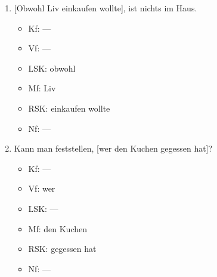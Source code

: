 \begin{enumerate}
\begin{itemize}
    \end{itemize}
  \item{} [Obwohl Liv einkaufen wollte], ist nichts im Haus.
    \begin{itemize}\Lf
      \item Kf: ---
      \item Vf: ---
      \item LSK: obwohl
      \item Mf: Liv
      \item RSK: einkaufen wollte
      \item Nf: ---
    \end{itemize}
  \item Kann man feststellen, [wer den Kuchen gegessen hat]?
    \begin{itemize}\Lf
      \item Kf: ---
      \item Vf: wer
      \item LSK: ---
      \item Mf: den Kuchen
      \item RSK: gegessen hat
      \item Nf: ---
    \end{itemize}
\end{enumerate}


